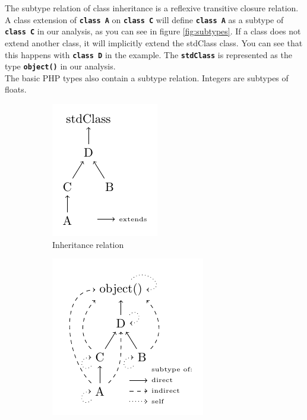 \documentclass[../main.tex]{subfiles}
\begin{document}
    The subtype relation of class inheritance is a \gls{reflexive transitive closure} relation.
    A class extension of \textbf{\texttt{class A}} on \textbf{\texttt{class C}} will define \textbf{\texttt{class A}} as a subtype of \textbf{\texttt{class C}} in our analysis, as you can see in figure \ref{fig:subtypes}.
    If a class does not extend another class, it will implicitly extend the \gls{stdClass} class.
    You can see that this happens with \textbf{\texttt{class D}} in the example.
    The \textbf{\texttt{stdClass}} is represented as the type \textbf{\texttt{object()}} in our analysis.
    \\
    The basic PHP types also contain a subtype relation.
    Integers are subtypes of floats.
 
    \begin{figure}[H]
    \begin{subfigure}[b]{.33\textwidth}
      \begin{center}
      \includegraphics[scale=1]{Diagrams/Inheritance_example.pdf}
      \caption{Inheritance relation}
      \label{fig:subtype}
      \end{center}
    \end{subfigure}
    \begin{subfigure}[b]{.33\textwidth}
      \begin{center}
      \includegraphics[scale=1]{Diagrams/Subtypes_example.pdf}

\end{center}
\end{subfigure}
\end{figure}
\end{document}
